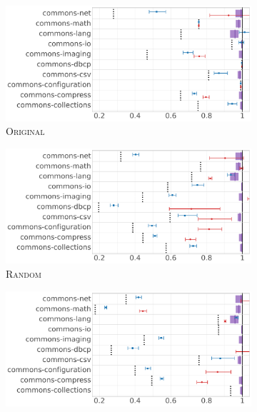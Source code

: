 \documentclass[sigconf]{acmart}
\newcommand{\original}{\textsc{Original}\xspace}
\newcommand{\EvosuiteRandom}{\textsc{Random}\xspace}
\begin{document}
\begin{figure}
\begin{subfigure}{.42\textwidth}
      \includegraphics[width=0.98\linewidth]{chaoplots/3/Chao-organic.pdf}
  \caption{\original} %
\label{fig:groundtruth1}
\end{subfigure}
\begin{subfigure}{.27\textwidth}
  \includegraphics[width=1\linewidth,trim=12.8cm 0cm 0cm 0cm, clip=true]{chaoplots/3/Chao-random.pdf}
\caption{\EvosuiteRandom} %
\label{fig:groundtruth3}
\end{subfigure}
\begin{subfigure}{.27\textwidth}
      \includegraphics[width=\linewidth,trim=12.8cm 0cm 0cm 0cm, clip=true]{chaoplots/3/Chao-dynamosa.pdf}

\end{subfigure}
\end{figure}
\end{document}
